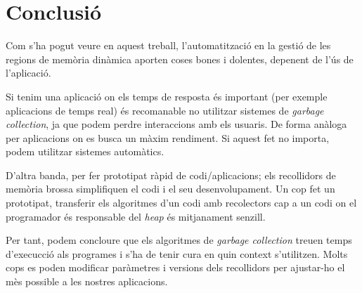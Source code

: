 \newpage
\section{Conclusió}
Com s'ha pogut veure en aquest treball, l'automatització en la gestió de les regions de memòria dinàmica aporten coses bones i dolentes, depenent de l'ús de l'aplicació.

Si tenim una aplicació on els temps de resposta és important (per exemple aplicacions de temps real) és recomanable no utilitzar sistemes de \textit{garbage collection}, ja que podem perdre interaccions amb els usuaris. De forma anàloga per aplicacions on es busca un màxim rendiment. Si aquest fet no importa, podem utilitzar sistemes automàtics.

D'altra banda, per fer prototipat ràpid de codi/aplicacions; els recollidors de memòria brossa simplifiquen el codi i el seu desenvolupament. Un cop fet un prototipat, transferir els algoritmes d'un codi amb recolectors cap a un codi on el programador és responsable del \textit{heap} és mitjanament senzill.

Per tant, podem concloure que els algoritmes de \textit{garbage collection} treuen temps d'execucció als programes i s'ha de tenir cura en quin context s'utilitzen. Molts cops es poden modificar paràmetres i versions dels recollidors per ajustar-ho el mès possible a les nostres aplicacions.